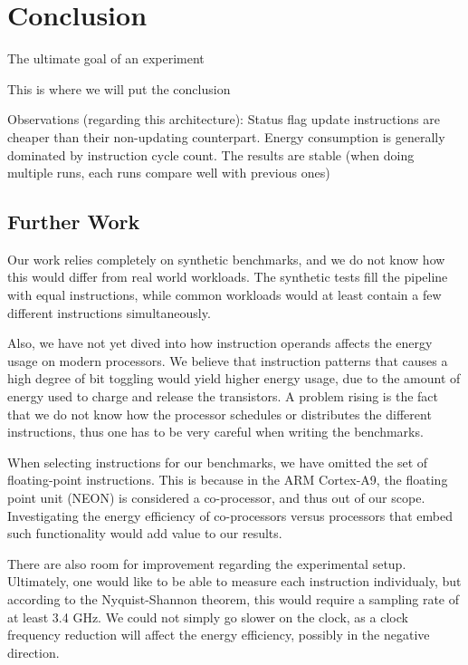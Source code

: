 \section{Conclusion}
The ultimate goal of an experiment 


This is where we will put the conclusion

Observations (regarding this architecture):
Status flag update instructions are cheaper than their non-updating counterpart.
Energy consumption is generally dominated by instruction cycle count.
The results are stable (when doing multiple runs, each runs compare well with
        previous ones)




\subsection{Further Work}

Our work relies completely on synthetic benchmarks, and we do not know how this
would differ from real world workloads. The synthetic tests fill the pipeline
with equal instructions, while common workloads would at least contain a few
different instructions simultaneously. 

Also, we have not yet dived into how instruction operands affects the energy usage on
modern processors. We believe that instruction patterns that causes a high
degree of bit toggling would yield higher energy usage, due to the amount of
energy used to charge and release the transistors. A problem rising is the fact
that we do not know how the processor schedules or distributes the different
instructions, thus one has to be very careful when writing the benchmarks.

When selecting instructions for our benchmarks, we have omitted the set of
floating-point instructions. This is because in the ARM Cortex-A9, the floating
point unit (NEON) is considered a co-processor\cite{armtech}, and thus out of
our scope. Investigating the energy efficiency of co-processors versus
processors that embed such functionality would add value to our results.

There are also room for improvement regarding the experimental setup. Ultimately,
one would like to be able to measure each instruction individualy, but according
to the Nyquist-Shannon theorem\cite{shannon1949communication}, this would
require a sampling rate of at least 3.4 GHz. We could not simply go slower on
the clock, as a clock frequency reduction will affect the energy
efficiency, possibly in the negative direction\cite{burd1995energy}.
